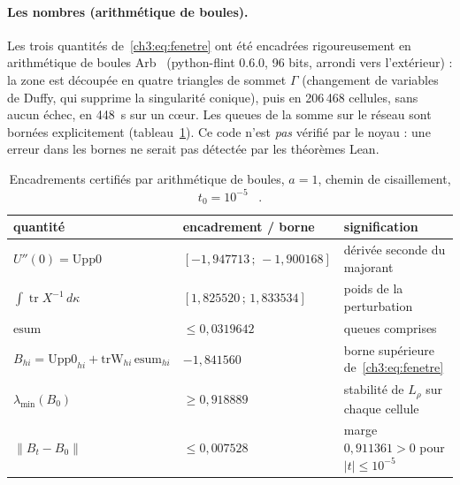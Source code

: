 \paragraph{Les nombres \tierC{} (arithmétique de boules).} Les trois quantités de~\eqref{ch3:eq:fenetre} ont été encadrées
rigoureusement en arithmétique de boules Arb~\cite{ch3-arb} (python-flint 0.6.0, 96 bits, arrondi vers l'extérieur) : la
zone est découpée en quatre triangles de sommet $\Gamma$ (changement de variables de Duffy, qui supprime la singularité
conique), puis en 206\,468 cellules, sans aucun échec, en 448~s sur un cœur. Les queues de la somme sur le réseau sont
bornées explicitement (tableau~\ref{ch3:tab:boules}). Ce code n'est \emph{pas} vérifié par le noyau : une erreur dans les
bornes ne serait pas détectée par les théorèmes Lean.
\begin{table}[ht]\centering\small
\caption{Encadrements certifiés par arithmétique de boules, $a=1$, chemin de cisaillement, $t_0=10^{-5}$
\tierC~\cite{ch3-b2}.}\label{ch3:tab:boules}
\begin{tabular}{lll}\toprule
quantité & encadrement / borne & signification\\\midrule
$U''(0)=\mathrm{Upp0}$ & $[-1{,}947713\,;\,-1{,}900168]$ & dérivée seconde du majorant\\
$\int\operatorname{tr}X^{-1}\,d\kappa$ & $[1{,}825520\,;\,1{,}833534]$ & poids de la perturbation\\
$\mathrm{esum}$ & $\le0{,}0319642$ & queues comprises\\
$B_{hi}=\mathrm{Upp0}_{hi}+\mathrm{trW}_{hi}\,\mathrm{esum}_{hi}$ & $-1{,}841560$ & borne supérieure de~\eqref{ch3:eq:fenetre}\\
$\lambda_{\min}(B_0)$ & $\ge0{,}918889$ & stabilité de $L_\rho$ sur chaque cellule\\
$\|B_t-B_0\|$ & $\le0{,}007528$ & marge $0{,}911361>0$ pour $|t|\le10^{-5}$\\
\bottomrule\end{tabular}
\end{table}


